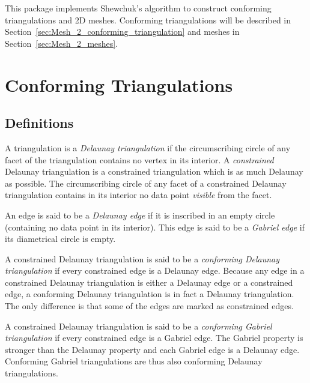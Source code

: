 



\minitoc

This package implements Shewchuk's algorithm \cite{s-mgdsa-00} to construct
conforming triangulations and 2D meshes. Conforming triangulations will be
described in Section~\ref{sec:Mesh_2_conforming_triangulation} and
meshes in Section~\ref{sec:Mesh_2_meshes}.

\section{Conforming Triangulations\label{sec:Mesh_2_conforming_triangulation}}

\subsection{Definitions\label{sec:Mesh_2_conforming_definitions}}

A triangulation is a \emph{Delaunay triangulation} if the circumscribing
circle of any facet of the triangulation contains no vertex in its
interior. A \emph{constrained} Delaunay triangulation is a constrained
triangulation which is as much Delaunay as possible. The circumscribing
circle of any facet of a constrained Delaunay triangulation contains in its
interior no data point \emph{visible} from the facet.

An edge is said to be a \emph{Delaunay edge} if it is inscribed in an empty
circle (containing no data point in its interior). This edge is said to be a
\emph{Gabriel edge} if its diametrical circle is empty.

A constrained Delaunay triangulation is said to be a \emph{conforming
  Delaunay triangulation} if every constrained edge is a Delaunay edge.
Because any edge in a constrained Delaunay triangulation is either a
Delaunay edge or a constrained edge, a conforming Delaunay triangulation is
in fact a Delaunay triangulation. The only difference is that some of the
edges are marked as constrained edges.

A constrained Delaunay triangulation is said to be a \emph{conforming
  Gabriel triangulation} if every constrained edge is a Gabriel edge. The
Gabriel property is stronger than the Delaunay property and each Gabriel
edge is a Delaunay edge. Conforming Gabriel triangulations are thus also
conforming Delaunay triangulations.

